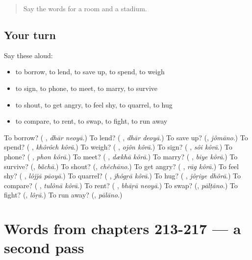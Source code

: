 \begin{quote}
Say the words for a room and a stadium.
\end{quote}

\subsection*{Your turn}
Say these aloud:

\begin{itemize}
\raggedright
  \item to borrow, to lend, to save up, to spend, to weigh
  \item to sign, to phone, to meet, to marry, to survive
  \item to shout, to get angry, to feel shy, to quarrel, to hug
  \item to compare, to rent, to swap, to fight, to run away
\end{itemize}

\begin{tcolorbox}[breakable,colback=teal!4,colframe=teal!35!black,title={Before you move on}]
To borrow? (\textbf{ }, \emph{dhār neoyā}.) To lend? (\textbf{ }, \emph{dhār deoyā}.) To save up? (\textbf{}, \emph{jômāno}.) To spend? (\textbf{ }, \emph{khôrôch kôrā}.) To weigh? (\textbf{ }, \emph{ojôn kôrā}.) To sign? (\textbf{ }, \emph{sôi kôrā}.) To phone? (\textbf{ }, \emph{phon kôrā}.) To meet? (\textbf{ }, \emph{dækhā kôrā}.) To marry? (\textbf{ }, \emph{biye kôrā}.) To survive? (\textbf{}, \emph{bā̃chā}.) To shout? (\textbf{}, \emph{chẽchāno}.) To get angry? (\textbf{ }, \emph{rāg kôrā}.) To feel shy? (\textbf{ }, \emph{lôjjā pāoyā}.) To quarrel? (\textbf{ }, \emph{jhôgṛā kôrā}.) To hug? (\textbf{ }, \emph{jôṛiye dhôrā}.) To compare? (\textbf{ }, \emph{tulônā kôrā}.) To rent? (\textbf{ }, \emph{bhāṛā neoyā}.) To swap? (\textbf{}, \emph{pālṭāno}.) To fight? (\textbf{}, \emph{lôṛā}.) To run away? (\textbf{}, \emph{pālāno}.)
\end{tcolorbox}
\section[(dialogue)]{Words from chapters 213-217 — a second pass}

